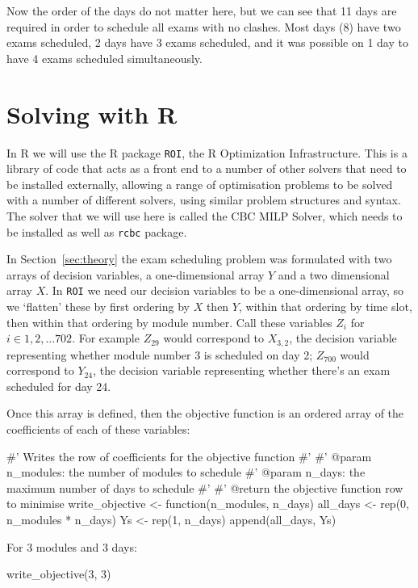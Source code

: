 Now the order of the days do not matter here, but we can see that 11 days are
required in order to schedule all exams with no clashes. Most days (8) have two
exams scheduled, 2 days have 3 exams scheduled, and it was possible on 1 day to
have 4 exams scheduled simultaneously.


\section{Solving with R}\label{sec:solving-with-R}

In R we will use the R package \texttt{ROI}, the R Optimization Infrastructure.
This is a library of code that acts as a front end to a number of other solvers that need to be installed externally, allowing a range of optimisation problems to be solved with a number of different solvers, using similar problem structures and syntax.
The solver that we will use here is called the CBC MILP Solver, which needs to be installed as well as \texttt{rcbc} package.

In Section~\ref{sec:theory} the exam scheduling problem was formulated with two arrays of decision variables, a one-dimensional array $Y$ and a two dimensional array $X$.
In \texttt{ROI} we need our decision variables to be a one-dimensional array, so we `flatten' these by first ordering by $X$ then $Y$, within that ordering by time slot, then within that ordering by module number.
Call these variables $Z_i$ for $i \in 1, 2, ... 702$.
For example $Z_{29}$ would correspond to $X_{3, 2}$, the decision variable representing whether module number 3 is scheduled on day 2; $Z_{700}$ would correspond to $Y_{24}$, the decision variable representing whether there's an exam scheduled for day 24.

Once this array is defined, then the objective function is an ordered array of the coefficients of each of these variables:

\begin{Rin}
#' Writes the row of coefficients for the objective function
#'
#' @param n_modules: the number of modules to schedule
#' @param n_days: the maximum number of days to schedule
#'
#' @return the objective function row to minimise
write_objective <- function(n_modules, n_days){
  all_days <- rep(0, n_modules * n_days)
  Ys <- rep(1, n_days)
  append(all_days, Ys)
}
\end{Rin}

For 3 modules and 3 days:

\begin{Rin}
write_objective(3, 3)
\end{Rin}

